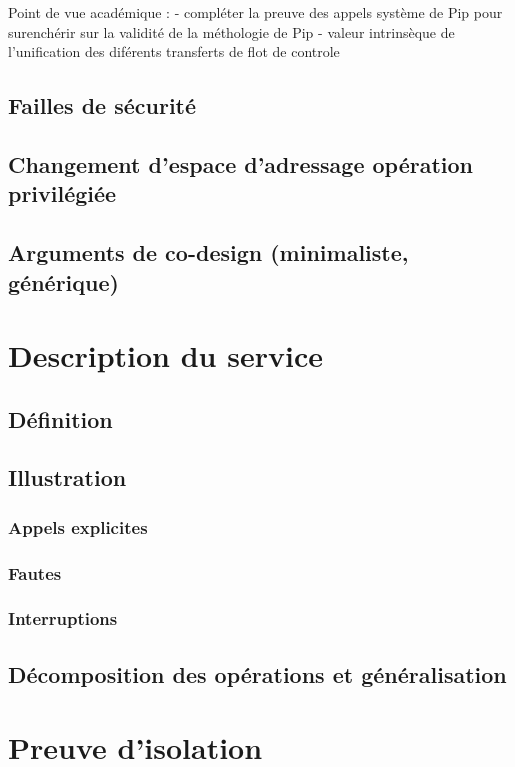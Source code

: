 		Point de vue académique :
			- compléter la preuve des appels système de Pip pour surenchérir sur la validité de la méthologie de Pip
			- valeur intrinsèque de l'unification des diférents transferts de flot de controle
		\subsection{Failles de sécurité}
		\subsection{Changement d'espace d'adressage opération privilégiée}
		\subsection{Arguments de co-design (minimaliste, générique)}
			

	\section{Description du service}
		\subsection{Définition}
		\subsection{Illustration}
			\subsubsection{Appels explicites}
			\subsubsection{Fautes}
			\subsubsection{Interruptions}

		\subsection{Décomposition des opérations et généralisation}

	\section{Preuve d'isolation}
